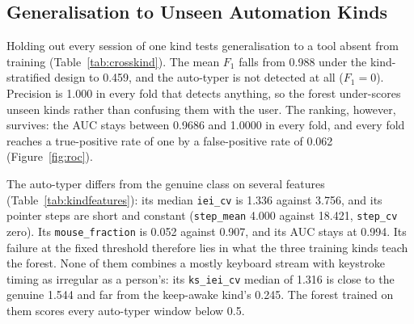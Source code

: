 \documentclass[sensors,article,submit,pdftex,oneauthor]{Definitions/mdpi}
\begin{document}


\subsection{Generalisation to Unseen Automation Kinds}
\label{sec:crosskind}
Holding out every session of one kind tests generalisation to a tool absent from training (Table~\ref{tab:crosskind}). The mean $F_1$ falls from 0.988 under the kind-stratified design to 0.459, and the auto-typer is not detected at all ($F_1 = 0$). Precision is 1.000 in every fold that detects anything, so the forest under-scores unseen kinds rather than confusing them with the user. The ranking, however, survives: the AUC stays between 0.9686 and 1.0000 in every fold, and every fold reaches a true-positive rate of one by a false-positive rate of 0.062 (Figure~\ref{fig:roc}).





The auto-typer differs from the genuine class on several features (Table~\ref{tab:kindfeatures}): its median \texttt{iei\_cv} is 1.336 against 3.756, and its pointer steps are short and constant (\texttt{step\_mean} 4.000 against 18.421, \texttt{step\_cv} zero). Its \texttt{mouse\_fraction} is 0.052 against 0.907, and its AUC stays at 0.994. Its failure at the fixed threshold therefore lies in what the three training kinds teach the forest. None of them combines a mostly keyboard stream with keystroke timing as irregular as a person's: its \texttt{ks\_iei\_cv} median of 1.316 is close to the genuine 1.544 and far from the keep-awake kind's 0.245. The forest trained on them scores every auto-typer window below 0.5.
\end{document}
